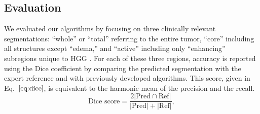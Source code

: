 \documentclass{llncs}
\begin{document}
\subsection{Evaluation}
We evaluated our algorithms by focusing on three clinically relevant segmentations: ``whole'' or ``total'' referring to the entire tumor, ``core'' including all structures except ``edema,'' and ``active'' including only ``enhancing'' subregions unique to HGG \cite{brats}. For each of these three regions, accuracy is reported using the Dice coefficient by comparing the predicted segmentation  with the expert reference and with previously developed algorithms. This score, given in Eq.~$\ref{eq:dice}$, is equivalent to the harmonic mean of the precision and the recall.
\begin{equation}\label{eq:dice}
\text{Dice score} = \frac{2 \left| \text{Pred} \cap \text{Ref} \right|}{\left| \text{Pred} \right| + \left| \text{Ref} \right|},
\end{equation}
\end{document}
